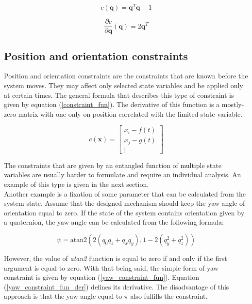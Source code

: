 \begin{equation}
	c \left( \bm{q} \right) = \bm{q}^T \bm{q} - 1
\label{quat_constraint_fun}
\end{equation}

\begin{equation}
	\frac{\partial c}{\partial \bm{q}}  \left( \bm{q} \right) = 2\bm{q}^T
	\label{quat_constraint_fun_der}
\end{equation}

\subsection{Position and orientation constraints}

Position and orientation constraints are the constraints that are known before the system moves. They may affect only selected state variables and be applied only at certain times. The general formula that describes this type of constraint is given by equation (\ref{constraint_fun}). The derivative of this function is a mostly-zero matrix with one only on position correlated with the limited state variable.

\begin{equation}
	c \left( \bm{x} \right) = \begin{bmatrix}
		x_i - f\left(t\right) \\
		x_j - g\left(t\right)\\
		\vdots
		\end{bmatrix}
	\label{constraint_fun}
\end{equation} 

The constraints that are given by an entangled function of multiple state variables are usually harder to formulate and require an individual analysis. An example of this type is given in the next section.\\

Another example is a fixation of some parameter that can be calculated from the system state. Assume that the designed mechanism should keep the yaw angle of orientation equal to zero. If the state of the system contains orientation given by a quaternion, the yaw angle can be calculated from the following formula:

\begin{equation}
	\psi = {\mbox{atan2}}\left(2(q_{0}q_{z}+q_{x}q_{y}),1-2(q_{y}^{2}+q_{z}^{2})\right)
\end{equation}

However, the value of \textit{atan2} function is equal to zero if and only if the first argument is equal to zero. With that being said, the simple form of yaw constraint is given by equation (\ref{yaw_constraint_fun}). Equation (\ref{yaw_constraint_fun_der}) defines its derivative. The disadvantage of this approach is that the yaw angle equal to $\pi$ also fulfills the constraint.

